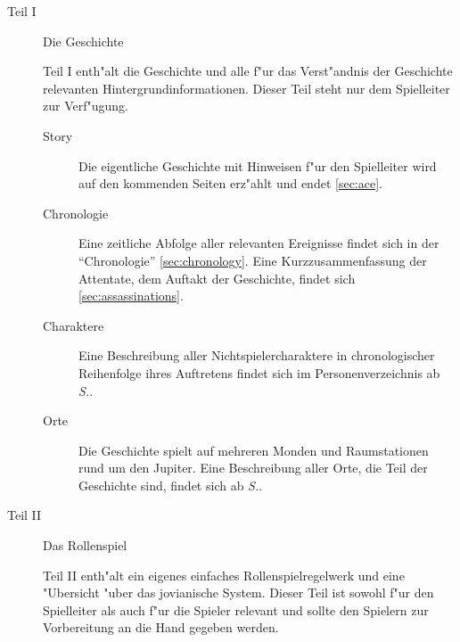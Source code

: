 \newcommand{\sfromref}[1]{ab \textit{S.\pageref{#1}}}
\begin{description}
    \item [Teil I] Die Geschichte

        Teil I enth"alt die Geschichte und alle f"ur das Verst"andnis der Geschichte relevanten Hintergrundinformationen. Dieser Teil steht nur dem Spielleiter zur Verf"ugung.
        \begin{description}
            \item [Story] Die eigentliche Geschichte mit Hinweisen f"ur den Spielleiter wird auf den kommenden Seiten erz"ahlt und endet \cref{sec:ace}.
            \item [Chronologie] Eine zeitliche Abfolge aller relevanten Ereignisse findet sich in der ``Chronologie'' 
                \cref{sec:chronology}. Eine Kurzzusammenfassung der Attentate, dem Auftakt der Geschichte, findet sich  \cref{sec:assassinations}.
            \item [Charaktere] Eine Beschreibung aller Nichtspielercharaktere in chronologischer Reihenfolge ihres Auftretens findet sich 
                im Personenverzeichnis  \sfromref{sec:nsc}.
            \item [Orte]  Die Geschichte spielt auf mehreren Monden und Raumstationen rund um den Jupiter. Eine Beschreibung aller Orte, 
                die Teil der Geschichte sind, findet sich \sfromref{sec:locations}.
        \end{description}

        \hbox{}\vspace{4ex}\hbox{}

    \item [Teil II] Das Rollenspiel

        Teil II enth"alt ein eigenes einfaches Rollenspielregelwerk und eine "Ubersicht "uber das jovianische System. Dieser Teil ist sowohl f"ur den Spielleiter als auch f"ur die Spieler relevant und sollte den Spielern zur Vorbereitung an die Hand gegeben werden. 
    

\end{description}
